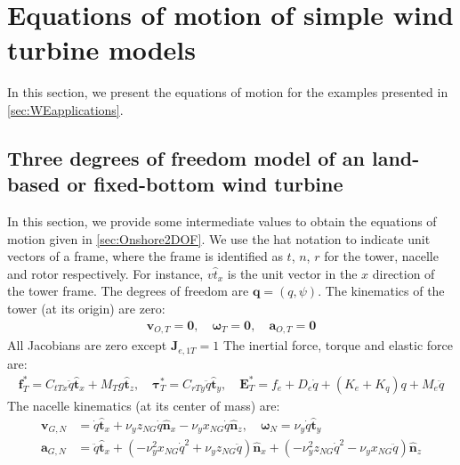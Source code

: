 \documentclass[wes, manuscript]{copernicus}
\renewcommand{\v}[1]{\boldsymbol{#1}}
\begin{document}
\section{Equations of motion of simple wind turbine models}

In this section, we present the equations of motion for the examples presented in \autoref{sec:WEapplications}. 
   


\subsection{Three degrees of freedom model of an land-based or fixed-bottom wind turbine}
\label{sec:Onshore2DOFEq}
In this section, we provide some intermediate values to obtain the equations of motion given in \autoref{sec:Onshore2DOF}.
We use the hat notation to indicate unit vectors of a frame, where the frame is identified as $t$, $n$, $r$ for the tower, nacelle and rotor respectively. For instance, $v{\hat{t}}_x$  is the unit vector in the $x$ direction of the tower frame.
% 
The degrees of freedom are $\v{q}=(q,\psi)$.
The kinematics of the tower (at its origin) are zero:
\begin{align}
\v{v}_{O,T} = \v{0}
, \quad
\v{\omega}_{T} = \v{0}
, \quad
\v{a}_{O,T} = \v{0}
\end{align}
All Jacobians are zero except $\v{J}_{e,1T}=1$
The inertial force, torque and elastic force are:
\begin{align}
\v{f}^*_T = C_{t Tx} \ddot{q}\v{\hat{t}}_x + M_{T} g\v{\hat{t}}_z
    ,\quad
\v{\tau}^*_T =  C_{r Ty} \ddot{q}\v{\hat{t}}_y
    ,\quad
\v{E}_T^*= f_e + D_{e} \dot{q} + (K_{e}+K_q) q + M_{e} \ddot{q}
\end{align}
The nacelle kinematics (at its center of mass) are:
\begin{align}
\v{v}_{G,N} &=  \dot{q}\v{\hat{t}}_x + \nu_y z_{NG} \dot{q}\v{\hat{n}}_x -  \nu_y x_{NG} \dot{q}\v{\hat{n}}_z
,\quad
\v{\omega}_{N} = \nu_y \dot{q}\v{\hat{t}}_y
\\
\v{a}_{G,N} &=  \ddot{q}\v{\hat{t}}_x + (- \nu_y^{2} x_{NG} \dot{q}^{2} + \nu_y z_{NG} \ddot{q})\v{\hat{n}}_x + (- \nu_y^{2} z_{NG} \dot{q}^{2} - \nu_y x_{NG} \ddot{q})\v{\hat{n}}_z
\end{align}
\end{document}
